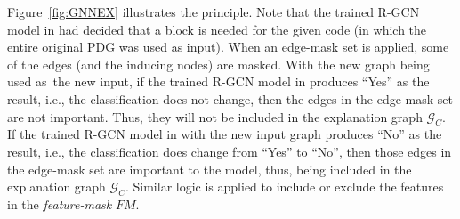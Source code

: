 
Figure~\ref{fig:GNNEX} illustrates the principle. Note that the
trained R-GCN model in {\xblock} had decided that a 
block is needed for the given code (in which the entire original PDG
was used as input). When an edge-mask set is applied, some of the
edges (and the inducing nodes) are masked. With the new graph being
used as~the new input, if the trained R-GCN model in {\xblock}
produces ``Yes'' as the result, i.e., the classification does not
change, then the edges in the edge-mask set are not important. Thus,
they will not be included in the explanation graph $\mathcal{G}_C$. If
the trained R-GCN model in {\xblock} with the new input graph produces
``No'' as the result, i.e., the classification does change from
``Yes'' to ``No'', then those edges in the edge-mask set are important
to the model, thus, being included in the explanation graph
$\mathcal{G}_C$. Similar logic is applied to include or exclude the
features in the {\em feature-mask} $FM$.





